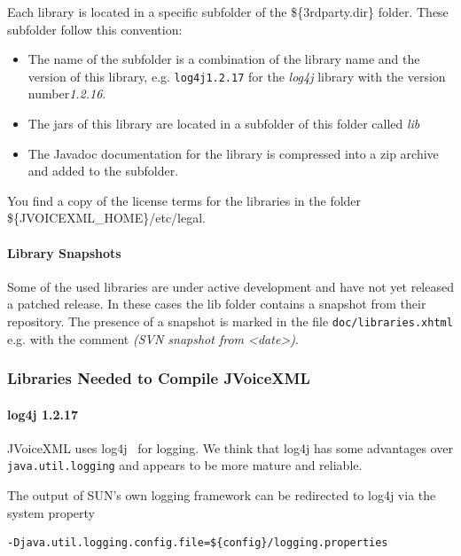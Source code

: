 \documentclass[11pt,a4paper]{article}
\begin{document}
Each library is located in a specific subfolder of the \$\{3rdparty.dir\}
folder. These subfolder follow this convention:

\begin{itemize}
\item The name of the subfolder is a combination of the library name and
the version of this library, e.g. \texttt{log4j1.2.17} for the \emph{log4j}
library with the version number\emph{1.2.16}.
\item The jars of this library are located in a subfolder of this folder
called \emph{lib}
\item The Javadoc documentation for the library is compressed into a zip
archive and added to the subfolder.
\end{itemize}

You find a copy of the license terms for the libraries in the folder\\
\$\{JVOICEXML\_HOME\}/etc/legal.

\paragraph{Library Snapshots}

Some of the used libraries are under active development and have not yet
released a patched release. In these cases the lib folder contains a snapshot
from their repository. The presence of a snapshot is marked in the file
\texttt{doc/libraries.xhtml} e.g. with the comment \emph{(SVN snapshot from
<date>)}.

\subsubsection{Libraries Needed to Compile JVoiceXML}
\label{sec:libr-need-comp}

\paragraph{log4j 1.2.17}

JVoiceXML uses log4j~\cite{apache:log4j} for logging. We think that log4j has 
some advantages
over \texttt{java.util.logging} and appears to be more mature and reliable.

The output of SUN's own logging framework can be redirected to log4j via the
system property
\begin{lstlisting}
-Djava.util.logging.config.file=${config}/logging.properties
\end{lstlisting}
\end{document}
